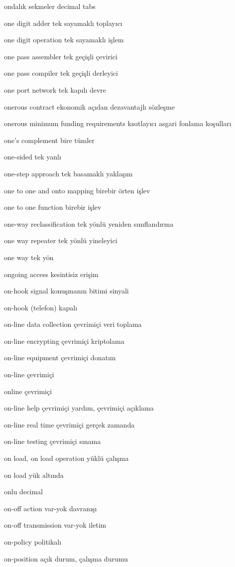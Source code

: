 \documentclass[12pt,fleqn]{article}\usepackage{../../common}
\begin{document}
ondalık sekmeler decimal tabs

one digit adder tek sayamaklı toplayıcı

one digit operation tek sayamaklı işlem

one pass assembler tek geçişli çevirici

one pass compiler tek geçişli derleyici

one port network tek kapılı devre

onerous contract ekonomik açıdan dezavantajlı sözleşme

onerous minimum funding requirements kısıtlayıcı asgari fonlama koşulları

one's complement bire tümler

one-sided tek yanlı

one-step approach tek basamaklı yaklaşım

one to one and onto mapping birebir örten işlev

one to one function birebir işlev

one-way reclassification tek yönlü yeniden sınıflandırma

one way repeater tek yönlü yineleyici

one way tek yön

ongoing access kesintisiz erişim

on-hook signal konuşmanın bitimi sinyali

on-hook (telefon) kapalı

on-line data collection çevrimiçi veri toplama

on-line encrypting çevrimiçi kriptolama

on-line equipment çevrimiçi donatım

on-line çevrimiçi

online çevrimiçi

on-line help çevrimiçi yardım, çevrimiçi açıklama

on-line real time çevrimiçi gerçek zamanda

on-line testing çevrimiçi sınama

on load, on load operation yüklü çalışma

on load yük altında

onlu decimal

on-off action var-yok davranışı

on-off transmission var-yok iletim

on-policy politikalı

on-position açık durum, çalışma durumu
\end{document}
